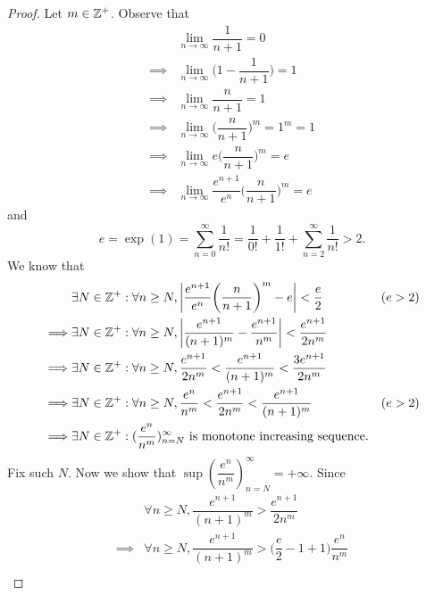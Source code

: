 \begin{proof}
  Let \(m \in \mathbb{Z}^+\).
  Observe that
  \begin{align*}
             & \lim_{n \to \infty} \dfrac{1}{n + 1} = 0                                      \\
    \implies & \lim_{n \to \infty} \bigg(1 - \dfrac{1}{n + 1}\bigg) = 1                      \\
    \implies & \lim_{n \to \infty} \dfrac{n}{n + 1} = 1                                      \\
    \implies & \lim_{n \to \infty} \bigg(\dfrac{n}{n + 1}\bigg)^m = 1^m = 1                  \\
    \implies & \lim_{n \to \infty} e \bigg(\dfrac{n}{n + 1}\bigg)^m = e                      \\
    \implies & \lim_{n \to \infty} \dfrac{e^{n + 1}}{e^n} \bigg(\dfrac{n}{n + 1}\bigg)^m = e
  \end{align*}
  and
  \[
    e = \exp(1) = \sum_{n = 0}^\infty \dfrac{1}{n!} = \dfrac{1}{0!} + \dfrac{1}{1!} + \sum_{n = 2}^\infty \dfrac{1}{n!} > 2.
  \]
  We know that
  \begin{align*}
             & \exists N \in \mathbb{Z}^+ : \forall n \geq N, \left\lvert\dfrac{e^{n + 1}}{e^n} \bigg(\dfrac{n}{n + 1}\bigg)^m - e\right\rvert < \dfrac{e}{2}         & (e > 2) \\
    \implies & \exists N \in \mathbb{Z}^+ : \forall n \geq N, \left\lvert\dfrac{e^{n + 1}}{(n + 1)^m} - \dfrac{e^{n + 1}}{n^m}\right\rvert < \dfrac{e^{n + 1}}{2 n^m}           \\
    \implies & \exists N \in \mathbb{Z}^+ : \forall n \geq N, \dfrac{e^{n + 1}}{2 n^m} < \dfrac{e^{n + 1}}{(n + 1)^m} < \dfrac{3 e^{n + 1}}{2 n^m}             \\
    \implies & \exists N \in \mathbb{Z}^+ : \forall n \geq N, \dfrac{e^n}{n^m} < \dfrac{e^{n + 1}}{2 n^m} < \dfrac{e^{n + 1}}{(n + 1)^m}             & (e > 2) \\
    \implies & \exists N \in \mathbb{Z}^+ : (\dfrac{e^n}{n^m})_{n = N}^\infty \text{ is monotone increasing sequence}.
  \end{align*}
  Fix such \(N\).
  Now we show that \(\sup(\dfrac{e^n}{n^m})_{n = N}^\infty = +\infty\).
  Since
  \begin{align*}
             & \forall n \geq N, \dfrac{e^{n + 1}}{(n + 1)^m} > \dfrac{e^{n + 1}}{2 n^m}                                                                                \\
    \implies & \forall n \geq N, \dfrac{e^{n + 1}}{(n + 1)^m} > \bigg(\dfrac{e}{2} - 1 + 1\bigg) \dfrac{e^n}{n^m}                                                       \\

\end{align*}
\end{proof}
